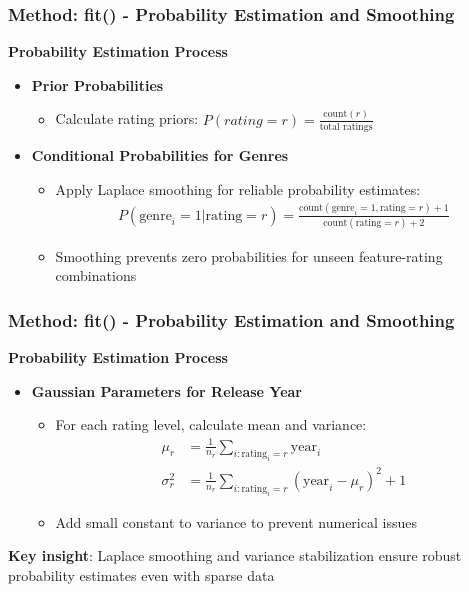 \documentclass{beamer}
\begin{document}
\begin{frame}
\frametitle{Method: fit() - Probability Estimation and Smoothing}
    \textbf{Probability Estimation Process}
    \begin{itemize}
        \item \textbf{Prior Probabilities}
        \begin{itemize}
            \item Calculate rating priors: $P(rating = r) = \frac{\text{count}(r)}{\text{total ratings}}$
        \end{itemize}
        
        \item \textbf{Conditional Probabilities for Genres}
        \begin{itemize}
            \item Apply Laplace smoothing for reliable probability estimates:
            \begin{align*}
            P(\text{genre}_i = 1 | \text{rating} = r) = \frac{\text{count}(\text{genre}_i = 1, \text{rating} = r) + 1}{\text{count}(\text{rating} = r) + 2}
            \end{align*}
            \item Smoothing prevents zero probabilities for unseen feature-rating combinations
        \end{itemize}
    \end{itemize}
\end{frame}

\begin{frame}
\frametitle{Method: fit() - Probability Estimation and Smoothing}
    \textbf{Probability Estimation Process}
    \begin{itemize}        
        \item \textbf{Gaussian Parameters for Release Year}
        \begin{itemize}
            \item For each rating level, calculate mean and variance:
            \begin{align*}
            \mu_r &= \frac{1}{n_r} \sum_{i: \text{rating}_i = r} \text{year}_i\\
            \sigma^2_r &= \frac{1}{n_r} \sum_{i: \text{rating}_i = r} (\text{year}_i - \mu_r)^2 + 1
            \end{align*}
            \item Add small constant to variance to prevent numerical issues
        \end{itemize}
    \end{itemize}
    
    \textbf{Key insight}: Laplace smoothing and variance stabilization ensure robust probability estimates even with sparse data
\end{frame}
\end{document}
